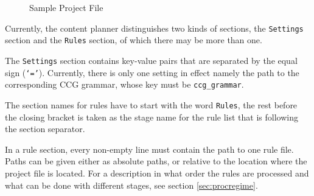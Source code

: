 \documentclass[11pt,a4paper]{article}
\begin{document}
\begin{figure}[htbp]
\centering{}
  \caption{Sample Project File}
  \label{fig:projectfile}
\end{figure}

Currently, the content planner distinguishes two kinds of sections, the
\texttt{Settings} section and the \texttt{Rules} section, of which there may be
more than one.

The \texttt{Settings} section contains key-value pairs that are separated by
the equal sign (\texttt{`='}). Currently, there is only one setting in effect
namely the path to the corresponding CCG grammar, whose key must be
\texttt{ccg\_grammar}.

The section names for rules have to start with the word \texttt{Rules}, the
rest before the closing bracket is taken as the stage name for the rule
list that is following the section separator.

In a rule section, every non-empty line must contain the path to one rule
file. Paths can be given either as absolute paths, or relative to the location
where the project file is located. For a description in what order the rules
are processed and what can be done with different stages, see section
\ref{sec:procregime}.

\end{document}
